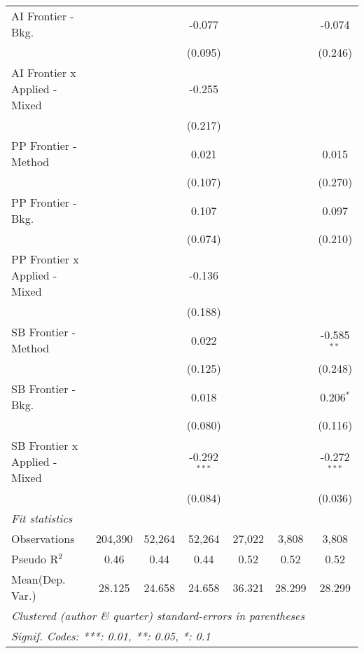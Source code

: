 \begin{tabular}{lcccccc}
   AI Frontier - Bkg.            &               &         & -0.077         &             &         & -0.074\\   
                                 &               &         & (0.095)        &             &         & (0.246)\\   
   AI Frontier x Applied - Mixed &               &         & -0.255         &             &         &   \\   
                                 &               &         & (0.217)        &             &         &   \\   
   PP Frontier - Method          &               &         & 0.021          &             &         & 0.015\\   
                                 &               &         & (0.107)        &             &         & (0.270)\\   
   PP Frontier - Bkg.            &               &         & 0.107          &             &         & 0.097\\   
                                 &               &         & (0.074)        &             &         & (0.210)\\   
   PP Frontier x Applied - Mixed &               &         & -0.136         &             &         &   \\   
                                 &               &         & (0.188)        &             &         &   \\   
   SB Frontier - Method          &               &         & 0.022          &             &         & -0.585$^{**}$\\   
                                 &               &         & (0.125)        &             &         & (0.248)\\   
   SB Frontier - Bkg.            &               &         & 0.018          &             &         & 0.206$^{*}$\\   
                                 &               &         & (0.080)        &             &         & (0.116)\\   
   SB Frontier x Applied - Mixed &               &         & -0.292$^{***}$ &             &         & -0.272$^{***}$\\   
                                 &               &         & (0.084)        &             &         & (0.036)\\   
   \midrule
   \emph{Fit statistics}\\
   Observations                  & 204,390       & 52,264  & 52,264         & 27,022      & 3,808   & 3,808\\  
   Pseudo R$^2$                  & 0.46          & 0.44    & 0.44           & 0.52        & 0.52    & 0.52\\  
Mean(Dep. Var.) & 28.125 & 24.658 & 24.658 & 36.321 & 28.299 & 28.299 \\
   \midrule \midrule
   \multicolumn{7}{l}{\emph{Clustered (author \& quarter) standard-errors in parentheses}}\\
   \multicolumn{7}{l}{\emph{Signif. Codes: ***: 0.01, **: 0.05, *: 0.1}}\\
\end{tabular}
\par\endgroup
